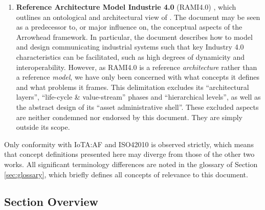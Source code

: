 \begin{enumerate}
\item \textbf{Reference Architecture Model Industrie 4.0} (RAMI4.0) \cite{adolphs2016reference}, which outlines an ontological and architectural view of .
The document may be seen as a predecessor to, or major influence on, the conceptual aspects of the Arrowhead framework.
In particular, the document describes how to model and design communicating industrial systems such that key Industry 4.0 characteristics can be facilitated, such as high degrees of dynamicity and interoperability.
However, as RAMI4.0 is a reference \textit{architecture} rather than a reference \textit{model}, we have only been concerned with what concepts it defines and what problems it frames.
This delimitation excludes its ``architectural layers'', ``life-cycle \& value-stream'' phases and ``hierarchical levels'', as well as the abstract design of its ``asset administrative shell''.
These excluded aspects are neither condemned nor endorsed by this document.
They are simply outside its scope.

\end{enumerate}

Only conformity with IoTA:AF and ISO42010 is observed strictly, which means that concept definitions presented here may diverge from those of the other two works.
All significant terminology differences are noted in the glossary of Section \ref{sec:glossary}, which briefly defines all concepts of relevance to this document.

\subsection{Section Overview}
\label{sec:introduction:sections}

